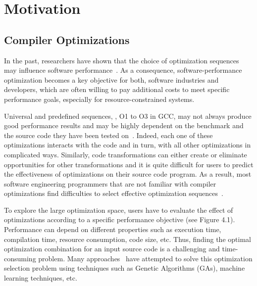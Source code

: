 
\section{Motivation}
\subsection{Compiler Optimizations}
In the past, researchers have shown that the choice of optimization sequences may influence software performance~\cite{almagor2004finding,chen2012deconstructing}. 
As a consequence, software-performance optimization becomes a key objective for both, software industries and developers, which are often willing to pay additional costs to meet specific performance goals, especially for resource-constrained systems.

Universal and predefined sequences, \eg, O1 to O3 in GCC, may not always produce good performance results and may be highly dependent on the benchmark and the source code they have been tested on~\cite{hoste2008cole,chen2010evaluating,escobar2015evaluation}.
Indeed, each one of these optimizations interacts with the code and in turn, with all other optimizations in complicated ways. Similarly, code transformations can either create or eliminate opportunities for other transformations and it is quite difficult for users to predict the effectiveness of optimizations on their source code program.
As a result, most software engineering programmers that are not familiar with compiler optimizations find difficulties to select effective optimization sequences~\cite{almagor2004finding}.

To explore the large optimization space, users have to evaluate the effect of optimizations according to a specific performance objective (see Figure 4.1). Performance can depend on different properties such as execution time, compilation time, resource consumption, code size, etc.
Thus, finding the optimal optimization combination for an input source code is a challenging and time-consuming problem. 
Many approaches~\cite{hoste2008cole,martins2014exploration} have attempted to solve this optimization selection problem using techniques such as Genetic Algorithms (GAs), machine learning techniques, etc.

